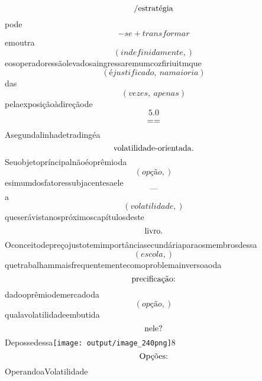 \documentclass{article}
\begin{document}
\begin{equation}
$/estratégia$
\end{equation}pode\begin{equation}
- se + transformar
\end{equation}emoutra\begin{equation}
\left( indefinidamente,\right)
\end{equation}eosoperadoressãolevadosaingressaremumcozfiriuitmque\begin{equation}
\left( éjustificado, \  namaioria\right)
\end{equation}das\begin{equation}
\left( vezes, \  apenas\right)
\end{equation}pelaexposiçãoàdireçãode\begin{equation}
5.0
\end{equation}\begin{equation}
$==$
\end{equation}Asegundalinhadetradingéa\begin{equation}
$volatilidade-orientada.$
\end{equation}Seuobjetopríncipalnãoéoprêmioda\begin{equation}
\left( opção,\right)
\end{equation}esimumdosfatoressubjacentesaele\begin{equation}
—
\end{equation}a\begin{equation}
\left( volatilidade,\right)
\end{equation}queserávistanospróximoscapítulosdeste\begin{equation}
$livro.$
\end{equation}Oconceitodepreçojustotemimportânciasecundáriaparaosmembrosdessa\begin{equation}
\left( escola,\right)
\end{equation}quetrabalhammaisfrequentementecomoproblemainversoaoda\begin{equation}
$precificação:$
\end{equation}dadooprêmiodemercadoda\begin{equation}
\left( opção,\right)
\end{equation}qualavolatilidadeembutida\begin{equation}
$nele?$
\end{equation}Depossedessa\texttt{[image: output/image\_240png]}8\begin{equation}
$Opções:$
\end{equation}OperandoaVolatilidade\begin{equation}

\end{equation}
\end{document}
